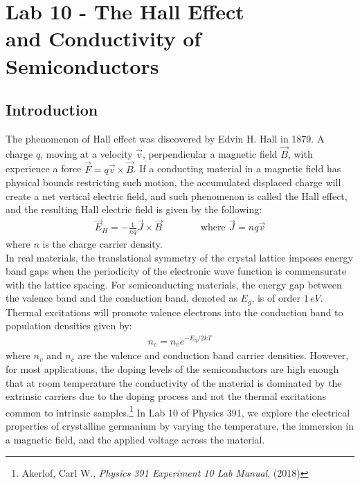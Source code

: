 \documentclass[11pt]{book}
\theoremstyle{break}
\theoremstyle{break}
\begin{document}
\newpage
\tableofcontents
{}


\chapter*{Lab 10 - The Hall Effect \\and Conductivity of 
Semiconductors}
\setcounter{chapter}{10}
\section{Introduction}
The phenomenon of Hall effect was discovered by Edvin H. Hall in 1879. A charge $q$, moving at a velocity $\vec{v}$, perpendicular a magnetic field $\vec{B}$, with experience a force $\vec{F} = q \vec{v}\times \vec{B}$. If a conducting  material in a magnetic field has physical bounds restricting such motion, the accumulated displaced charge will create a net vertical electric field, and such phenomenon is called the Hall effect, and the resulting Hall electric field is given by the following:
\begin{align}
\vec{E}_H = -\frac{1}{nq}\vec{J}\times \vec{B}\qquad\qquad \text{where }\vec{J} = nq\vec{v}
\end{align}
where $n$ is the charge carrier density.\\

In real materials, the translational  symmetry of the crystal lattice   imposes energy band gaps when the periodicity of the electronic wave function is commensurate 
with the lattice spacing. For semiconducting materials, the energy gap between the valence band and the conduction band, denoted as $E_g$, is of order $1\, eV$. Thermal excitations will promote valence electrons into the conduction band to population densities given by:
\begin{align}
n_c = n_v e^{-E_g /2kT}
\end{align}
where $n_v$ and $n_c$ are the valence and conduction band carrier densities. However, for most applications, the doping levels of the semiconductors are high enough that at room temperature the conductivity of the material is dominated by the
extrinsic carriers due to the doping process and not the thermal excitations common to intrinsic samples.\footnote{Akerlof, Carl W., \textit{Physics 391 Experiment 10 Lab Manual}, (2018)} In Lab 10 of Physics 391, we  explore  the  electrical  properties  of  crystalline  germanium  by varying the temperature, the immersion in a magnetic field, and the applied voltage across the material. 
\end{document}

